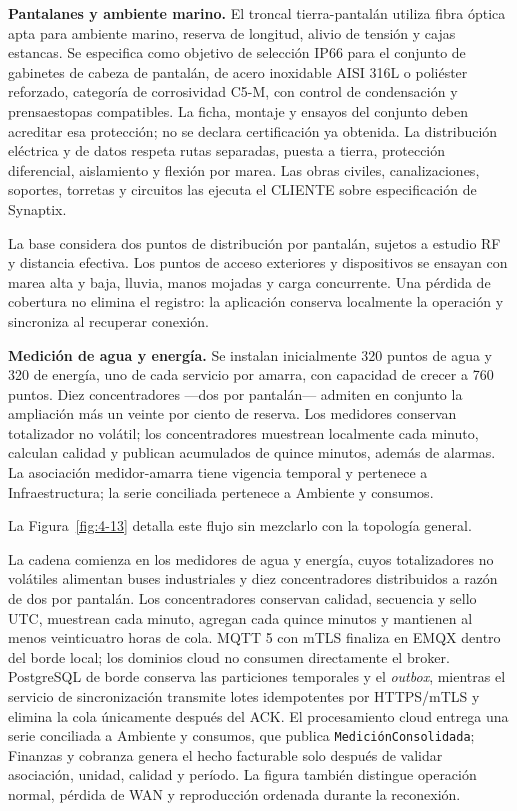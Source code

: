 \textbf{Pantalanes y ambiente marino.} El troncal tierra-pantalán utiliza fibra óptica apta para ambiente marino, reserva de longitud, alivio de tensión y cajas estancas. Se especifica como objetivo de selección IP66 para el conjunto de gabinetes de cabeza de pantalán, de acero inoxidable AISI 316L o poliéster reforzado, categoría de corrosividad C5-M, con control de condensación y prensaestopas compatibles. La ficha, montaje y ensayos del conjunto deben acreditar esa protección; no se declara certificación ya obtenida. La distribución eléctrica y de datos respeta rutas separadas, puesta a tierra, protección diferencial, aislamiento y flexión por marea. Las obras civiles, canalizaciones, soportes, torretas y circuitos las ejecuta el CLIENTE sobre especificación de Synaptix.

La base considera dos puntos de distribución por pantalán, sujetos a estudio RF y distancia efectiva. Los puntos de acceso exteriores y dispositivos se ensayan con marea alta y baja, lluvia, manos mojadas y carga concurrente. Una pérdida de cobertura no elimina el registro: la aplicación conserva localmente la operación y sincroniza al recuperar conexión.

\textbf{Medición de agua y energía.} Se instalan inicialmente 320 puntos de agua y 320 de energía, uno de cada servicio por amarra, con capacidad de crecer a 760 puntos. Diez concentradores —dos por pantalán— admiten en conjunto la ampliación más un veinte por ciento de reserva. Los medidores conservan totalizador no volátil; los concentradores muestrean localmente cada minuto, calculan calidad y publican acumulados de quince minutos, además de alarmas. La asociación medidor-amarra tiene vigencia temporal y pertenece a Infraestructura; la serie conciliada pertenece a Ambiente y consumos.

La Figura~\ref{fig:4-13} detalla este flujo sin mezclarlo con la topología general.



La cadena comienza en los medidores de agua y energía, cuyos totalizadores no volátiles alimentan buses industriales y diez concentradores distribuidos a razón de dos por pantalán. Los concentradores conservan calidad, secuencia y sello UTC, muestrean cada minuto, agregan cada quince minutos y mantienen al menos veinticuatro horas de cola. MQTT 5 con mTLS finaliza en EMQX dentro del borde local; los dominios cloud no consumen directamente el broker. PostgreSQL de borde conserva las particiones temporales y el \emph{outbox}, mientras el servicio de sincronización transmite lotes idempotentes por HTTPS/mTLS y elimina la cola únicamente después del ACK. El procesamiento cloud entrega una serie conciliada a Ambiente y consumos, que publica \texttt{MediciónConsolidada}; Finanzas y cobranza genera el hecho facturable solo después de validar asociación, unidad, calidad y período. La figura también distingue operación normal, pérdida de WAN y reproducción ordenada durante la reconexión.

